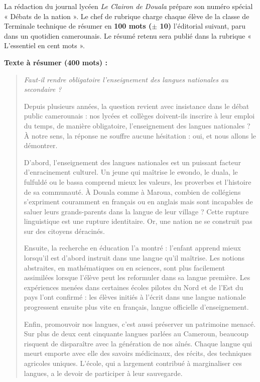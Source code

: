 \documentclass[11pt]{article}
\newcounter{popsec}
\newcounter{popsub}
\newcommand{\courssub}[1]{%
  \stepcounter{popsub}%
  \par\vspace{9pt}\noindent{\popxbold\fontsize{11.5}{13}\selectfont\color{popink}{\color{poporange}\thepopsec.\thepopsub}\hspace{6pt}#1}\par\nopagebreak\vspace{4pt}
}
\begin{document}
\courssub{Situation}

La rédaction du journal lycéen \emph{Le Clairon de Douala} prépare son numéro spécial « Débats de la nation ». Le chef de rubrique charge chaque élève de la classe de Terminale technique de résumer en \textbf{100 mots ($\pm$ 10)} l'éditorial suivant, paru dans un quotidien camerounais. Le résumé retenu sera publié dans la rubrique « L'essentiel en cent mots ».

\textbf{Texte à résumer (400 mots) :}

\begin{quote}
\emph{Faut-il rendre obligatoire l'enseignement des langues nationales au secondaire ?}

Depuis plusieurs années, la question revient avec insistance dans le débat public camerounais : nos lycées et collèges doivent-ils inscrire à leur emploi du temps, de manière obligatoire, l'enseignement des langues nationales ? À notre sens, la réponse ne souffre aucune hésitation : oui, et nous allons le démontrer.

D'abord, l'enseignement des langues nationales est un puissant facteur d'enracinement culturel. Un jeune qui maîtrise le ewondo, le duala, le fulfuldé ou le bassa comprend mieux les valeurs, les proverbes et l'histoire de sa communauté. À Douala comme à Maroua, combien de collégiens s'expriment couramment en français ou en anglais mais sont incapables de saluer leurs grands-parents dans la langue de leur village ? Cette rupture linguistique est une rupture identitaire. Or, une nation ne se construit pas sur des citoyens déracinés.

Ensuite, la recherche en éducation l'a montré : l'enfant apprend mieux lorsqu'il est d'abord instruit dans une langue qu'il maîtrise. Les notions abstraites, en mathématiques ou en sciences, sont plus facilement assimilées lorsque l'élève peut les reformuler dans sa langue première. Les expériences menées dans certaines écoles pilotes du Nord et de l'Est du pays l'ont confirmé : les élèves initiés à l'écrit dans une langue nationale progressent ensuite plus vite en français, langue officielle d'enseignement.

Enfin, promouvoir nos langues, c'est aussi préserver un patrimoine menacé. Sur plus de deux cent cinquante langues parlées au Cameroun, beaucoup risquent de disparaître avec la génération de nos aînés. Chaque langue qui meurt emporte avec elle des savoirs médicinaux, des récits, des techniques agricoles uniques. L'école, qui a largement contribué à marginaliser ces langues, a le devoir de participer à leur sauvegarde.


\end{quote}
\end{document}
